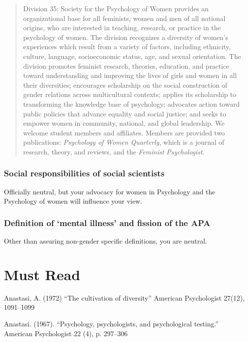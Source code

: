 \begin{refsection}
\begin{quote}

Division 35: Society for the Psychology of Women provides an organizational base for all feminists, women and men of all national origins, who are interested in teaching, research, or practice in the psychology of women. The division recognizes a diversity of women's experiences which result from a variety of factors, including ethnicity, culture, language, socioeconomic status, age, and sexual orientation. The division promotes feminist research, theories, education, and practice toward understanding and improving the lives of girls and women in all their diversities; encourages scholarship on the social construction of gender relations across multicultural contexts; applies its scholarship to transforming the knowledge base of psychology; advocates action toward public policies that advance equality and social justice; and seeks to empower women in community, national, and global leadership. We welcome student members and affiliates. Members are provided two publications: \emph{Psychology of Women Quarterly}, which is a journal of research, theory, and reviews, and the \emph{Feminist Psychologist}.
\end{quote}

\subsubsection{Social responsibilities of social scientists}
\label{socialresponsibilitiesofsocialscientists}

Officially neutral, but your advocacy for women in Psychology and the Psychology of women will influence your view.

\subsubsection{Definition of ‘mental illness’ and fission of the APA}
\label{definitionof‘mentalillness’andfissionoftheapa}

Other than assuring non-gender specific definitions, you are neutral.

\section{Must Read}
\label{mustread}

Anastasi, A. (1972) “The cultivation of diversity” American Psychologist 27(12), 1091--1099

Anastasi. (1967). “Psychology, psychologists, and psychological testing.” American Psychologist 22 (4), p. 297--306


\end{refsection}
